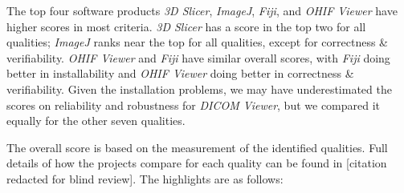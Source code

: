 \documentclass[final, 12pt, 3p, times]{elsarticle}
\begin{document}
The top four software products \textit{3D Slicer}, \textit{ImageJ},
\textit{Fiji}, and \textit{OHIF Viewer} have higher scores in most criteria.
\textit{3D Slicer} has a score in the top two for all qualities; \textit{ImageJ}
ranks near the top for all qualities, except for correctness \& verifiability.
\textit{OHIF Viewer} and \textit{Fiji} have similar overall scores, with
\textit{Fiji} doing better in installability and \textit{OHIF Viewer} doing
better in correctness \& verifiability.  Given the installation problems, we may
have underestimated the scores on reliability and robustness for \textit{DICOM
Viewer}, but we compared it equally for the other seven qualities.

The overall score is based on the measurement of the identified qualities. Full
details of how the projects compare for each quality can be found in [citation
redacted for blind review].
The highlights are as follows:
\end{document}
